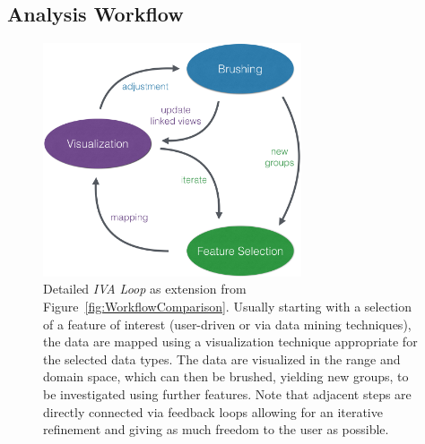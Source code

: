 \documentclass[journal]{style/vgtc} 			          %
\begin{document}
\subsection{Analysis Workflow}
\begin{figure}[htb]
 \centering
 \includegraphics[width=3.0in]{figures/InteractionLoop}
 \caption{Detailed \emph{IVA Loop} as extension from Figure~\ref{fig:WorkflowComparison}.
 Usually starting with a selection of a feature of interest (user-driven or via data mining techniques), the data are mapped using a visualization technique appropriate for the selected data types.
 The data are visualized in the range and domain space, which can then be brushed, yielding new groups, to be investigated using further features.
 Note that adjacent steps are directly connected via feedback loops allowing for an iterative refinement and giving as much freedom to the user as possible.}
 \label{fig:InteractionLoop}
\end{figure}
\end{document}
